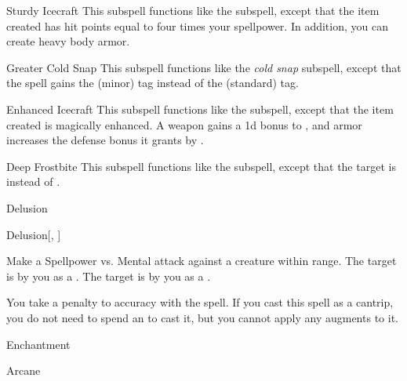 \begin{ability}[\nth{4}]{Sturdy Icecraft}
This subspell functions like the  subspell, except that the item created has hit points equal to four times your spellpower.
In addition, you can create heavy body armor.
\end{ability}
\vspace{0.25em}


\begin{ability}[\nth{5}]{Greater Cold Snap}
This subspell functions like the \textit{cold snap} subspell, except that the spell gains the  (minor) tag instead of the  (standard) tag.
\end{ability}
\vspace{0.25em}


\begin{ability}[\nth{6}]{Enhanced Icecraft}
This subspell functions like the  subspell, except that the item created is magically enhanced.
A weapon gains a \plus1d bonus to , and armor increases the defense bonus it grants by .
\end{ability}
\vspace{0.25em}


\begin{ability}[\nth{7}]{Deep Frostbite}
This subspell functions like the  subspell, except that the target is  instead of .
\end{ability}
\vspace{0.25em}

\newpage
\begin{spellsection}{Delusion}

\begin{spellheader}
\end{spellheader}


\begin{ability}{Delusion}[, ]

Make a Spellpower vs. Mental attack against a creature within \rngmed range.
\hit The target is \frightened by you as a .
\crit The target is \panicked by you as a .

\end{ability}



You take a  penalty to accuracy with the spell.
If you cast this spell as a cantrip,
you do not need to spend an  to cast it,
but you cannot apply any augments to it.


 Enchantment

 Arcane
\end{spellsection}


